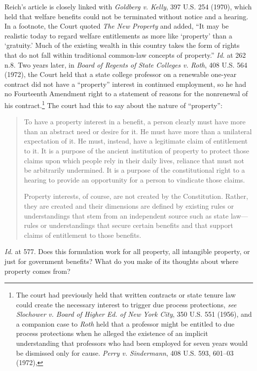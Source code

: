 
\item Reich's article is closely linked with \textit{Goldberg v. Kelly}, 397
U.S. 254 (1970), which held that welfare benefits could not be terminated
without notice and a hearing. In a footnote, the Court quoted \textit{The New
Property }and added, ``It may be realistic today to regard welfare entitlements
as more like `property' than a `gratuity.' Much of the existing wealth in this
country takes the form of rights that do not fall within traditional common-law
concepts of property.'' \textit{Id}. at 262 n.8. Two years later, in
\textit{Board of Regents of State Colleges v. Roth}, 408 U.S. 564 (1972), the
Court held that a state college professor on a renewable one-year contract did
not have a ``property'' interest in continued employment, so he had no
Fourteenth Amendment right to a statement of reasons for the nonrenewal of his
contract.\footnote{The court had previously held that written contracts or
state tenure law could create the necessary interest to trigger due process
protections, \textit{see} \textit{Slochower v. Board of Higher Ed. of New York
City}, 350 U.S. 551 (1956), and a companion case to \textit{Roth} held that a
professor might be entitled to due process protections when he alleged the
existence of an implicit understanding that professors who had been employed
for seven years would be dismissed only for cause. \textit{Perry v.
Sindermann}, 408 U.S. 593, 601--03 (1972),} The court had this to say about the
nature of ``property'':
\begin{quotation}
To have a property interest in a benefit, a person clearly must have more than
an abstract need or desire for it. He must have more than a unilateral
expectation of it. He must, instead, have a legitimate claim of entitlement to
it. It is a purpose of the ancient institution of property to protect those
claims upon which people rely in their daily lives, reliance that must not be
arbitrarily undermined. It is a purpose of the constitutional right to a
hearing to provide an opportunity for a person to vindicate those claims.

Property interests, of course, are not created by the Constitution. Rather, they
are created and their dimensions are defined by existing rules or
understandings that stem from an independent source such as state law---rules
or understandings that secure certain benefits and that support claims of
entitlement to those benefits.
\end{quotation}
\textit{Id.} at 577.
Does this formulation work for all property, all intangible property, or just
for government
benefits? What do you make of its thoughts about where property comes from?

